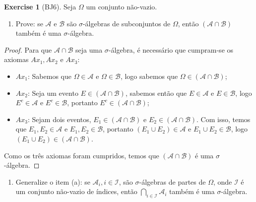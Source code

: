 \documentclass[
]{article}
\providecommand{\tightlist}{%
  \setlength{\itemsep}{0pt}\setlength{\parskip}{0pt}}
\theoremstyle{definition}
\theoremstyle{definition}
\theoremstyle{definition}
\newtheorem{exercise}{Exercise}[section]
\theoremstyle{definition}
\theoremstyle{remark}
\begin{document}
\begin{exercise}[BJ6]

Seja \(\Omega\) um conjunto não-vazio.

\begin{enumerate}
\def\labelenumi{\alph{enumi})}
\tightlist
\item
  Prove: se \(\mathcal{A}\) e \(\mathcal{B}\) são \(\sigma\)-álgebras de subconjuntos de \(\Omega\), então \((\mathcal{A} \cap \mathcal{B})\) também é uma \(\sigma\)-álgebra.
\end{enumerate}

\begin{proof}
Para que \(\mathcal{A} \cap \mathcal{B}\) seja uma \(\sigma\)-álgebra, é necessário que cumpram-se os axiomas \(Ax_{1}, Ax_{2}\) e \(Ax_{3}\):

\begin{itemize}
\tightlist
\item
  \(Ax_{1}\): Sabemos que \(\Omega \in \mathcal{A}\) e \(\Omega \in \mathcal{B}\), logo sabemos que \(\Omega \in (\mathcal{A} \cap \mathcal{B})\);
\item
  \(Ax_{2}\): Seja um evento \(E \in (\mathcal{A} \cap \mathcal{B})\), sabemos então que \(E \in \mathcal{A}\) e \(E \in \mathcal{B}\), logo \(E^{c} \in \mathcal{A}\) e \(E^{c} \in \mathcal{B}\), portanto \(E^{c} \in (\mathcal{A} \cap \mathcal{B})\);
\item
  \(Ax_{3}\): Sejam dois eventos, \(E_{1} \in (\mathcal{A} \cap \mathcal{B})\) e \(E_{2} \in (\mathcal{A} \cap \mathcal{B})\). Com isso, temos que \(E_{1}, E_{2} \in \mathcal{A}\) e \(E_{1}, E_{2} \in \mathcal{B}\), portanto \((E_{1} \cup E_{2}) \in \mathcal{A}\) e \(E_{1} \cup E_{2} \in \mathcal{B}\), logo \((E_{1} \cup E_{2}) \in (\mathcal{A} \cap \mathcal{B})\).
\end{itemize}

Como os três axiomas foram cumpridos, temos que \((\mathcal{A} \cap \mathcal{B})\) é uma \(\sigma\)-álgebra.
\end{proof}

\begin{enumerate}
\def\labelenumi{\alph{enumi})}
\setcounter{enumi}{1}
\tightlist
\item
  Generalize o item (a): se \(\mathcal{A}_{i}, i \in \mathcal{I}\), são \(\sigma\)-álgebras de partes de \(\Omega\), onde \(\mathcal{I}\) é um conjunto não-vazio de índices, então \(\bigcap_{i \in \mathcal{I}}\mathcal{A}_{i}\) também é uma \(\sigma\)-álgebra.
\end{enumerate}


\end{exercise}
\end{document}
